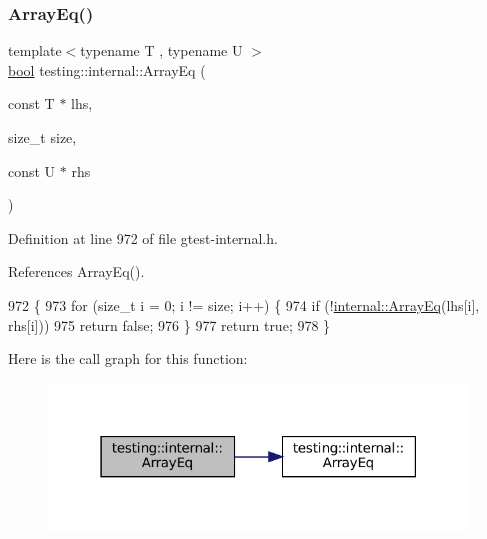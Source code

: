 \subsubsection{\texorpdfstring{Array\+Eq()}{ArrayEq()}\hspace{0.1cm}{\footnotesize\ttfamily [1/3]}}
{\footnotesize\ttfamily template$<$typename T , typename U $>$ \\
\hyperlink{classbool}{bool} testing\+::internal\+::\+Array\+Eq (\begin{DoxyParamCaption}\item[{const T $\ast$}]{lhs,  }\item[{size\+\_\+t}]{size,  }\item[{const U $\ast$}]{rhs }\end{DoxyParamCaption})}



Definition at line 972 of file gtest-\/internal.\+h.



References Array\+Eq().


\begin{DoxyCode}
972                                                       \{
973   \textcolor{keywordflow}{for} (\textcolor{keywordtype}{size\_t} i = 0; i != size; i++) \{
974     \textcolor{keywordflow}{if} (!\hyperlink{namespacetesting_1_1internal_a5cb6f81ee827130024261121c742b26c}{internal::ArrayEq}(lhs[i], rhs[i]))
975       \textcolor{keywordflow}{return} \textcolor{keyword}{false};
976   \}
977   \textcolor{keywordflow}{return} \textcolor{keyword}{true};
978 \}
\end{DoxyCode}
Here is the call graph for this function\+:
\nopagebreak
\begin{figure}[H]
\begin{center}
\leavevmode
\includegraphics[width=316pt]{namespacetesting_1_1internal_af4bebf36baf0b0a5b26d051dde55fa47_cgraph}
\end{center}
\end{figure}
\mbox{\label{namespacetesting_1_1internal_a49b4d0ee49c0f8c93bab29ebd20630cc}} 
